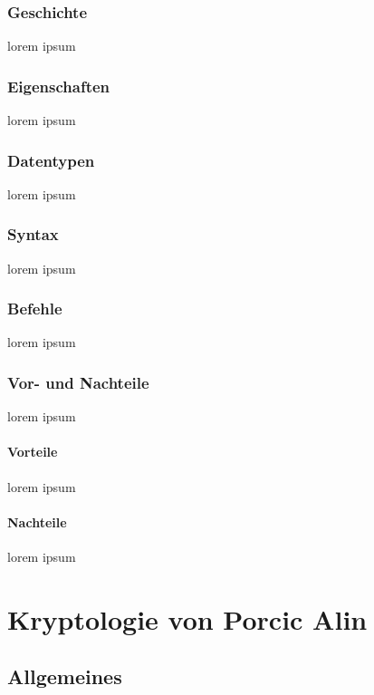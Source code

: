 \documentclass[12pt,a4paper]{report}
\begin{document}
\subsubsection{Geschichte}
lorem ipsum
\subsubsection{Eigenschaften}
lorem ipsum
\subsubsection{Datentypen}
lorem ipsum
\subsubsection{Syntax}
lorem ipsum 
\subsubsection{Befehle}
lorem ipsum
\subsubsection{Vor- und Nachteile}
lorem ipsum
\paragraph{Vorteile}
lorem ipsum
\paragraph{Nachteile}
lorem ipsum

\section{Kryptologie von Porcic Alin}
\subsection{Allgemeines}
\end{document}
